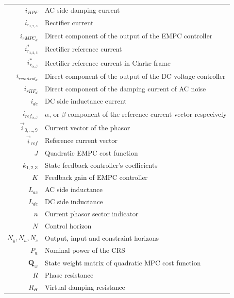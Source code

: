 \begin{scriptsize}
\begin{tabularx}{\textwidth}{r|X}
  $i_{HPF}$                         & AC side damping current\\
  $i_{r_{1,2,3}}$                   & Rectifier current\\
  $i_{rMPC_d}$                      & Direct component of the output of the EMPC controller\\
  $i^*_{r_{1,2,3}}$                 & Rectifier reference current\\
  $i^*_{r_{\alpha,\beta}}$          & Rectifier reference current in Clarke frame\\
  $i_{rcontrol_d}$                  & Direct component of the output of the DC voltage controller\\
  $i_{rHF_d}$                       & Direct component of the damping current of AC noise\\
  $i_{dc}$                          & DC side inductance current\\
  $i_{ref_{\alpha,\beta}}$          & $\alpha$, or $\beta$ component of the reference current vector respecively\\
  $\vec{i}_{0,\dots,9}$             & Current vector of the phasor\\
  $\vec{i}_{ref}$                   & Reference current vector\\
  $J$                               & Quadratic EMPC cost function\\
  $k_{1,2,3}$                       & State feedback controller's coefficients\\
  $K$                               & Feedback gain of EMPC controller\\
  $L_{ac}$                          & AC side inductance\\
  $L_{dc}$                          & DC side inductance\\
  $n$                               & Current phasor sector indicator\\
  $N$                               & Control horizon\\
  $N_y,N_u,N_c$                     & Output, input and constraint horizons\\
  $P_n$                             & Nominal power of the CRS\\
  $\boldsymbol{Q}_w$                & State weight matrix of quadratic MPC cost function\\
  $R$                               & Phase resistance\\
  $R_H$                             & Virtual damping resistance\\

\end{tabularx}
\end{scriptsize}
